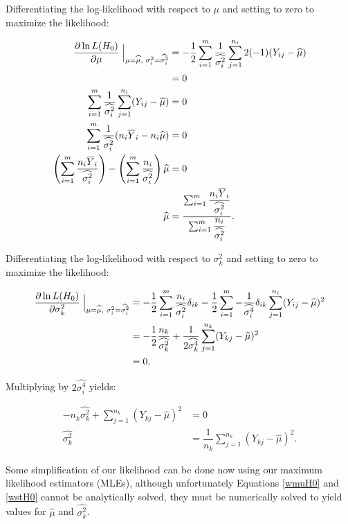 \documentclass[12pt,a4paper]{article}
\newcommand{\ovY}{\overline{Y}}
\newcommand{\wmu}{\widehat{\mu}}
\newcommand{\wst}[1]{\widehat{\sigma^2_{#1}}}
\newcommand{\wstq}[1]{\widehat{\sigma^4_{#1}}}
\begin{document}
	Differentiating the log-likelihood with respect to $\mu$ and setting to zero to maximize the likelihood:
	
	\begin{align}
		\dfrac{\partial \ln{L(H_0)}}{\partial \mu} \Bigm\lvert_{\mu = \wmu, \hspace{0.1cm}\sigma^2_i = \wst{i}} &= -\dfrac{1}{2} \sum_{i=1}^m \dfrac{1}{\wst{i}}\sum_{j=1}^{n_i} 2(-1)(Y_{ij}-\wmu) \nonumber\\
		&= 0 \nonumber\\
		\sum_{i=1}^m \dfrac{1}{\wst{i}}\sum_{j=1}^{n_i} (Y_{ij}-\wmu) &= 0 \nonumber\\
		\sum_{i=1}^m \dfrac{1}{\wst{i}} (n_i\ovY_i - n_i \wmu) &= 0 \nonumber\\
		\left(\sum_{i=1}^m \dfrac{n_i \ovY_i}{\wst{i}}\right) - \left(\sum_{i=1}^m \dfrac{n_i}{\wst{i}}\right)\wmu &= 0 \nonumber \\
		\wmu &= \dfrac{\sum_{i=1}^m \dfrac{n_i \ovY_i}{\wst{i}}}{\sum_{i=1}^m \dfrac{n_i}{\wst{i}}}. \label{wmuH0}
	\end{align}

	Differentiating the log-likelihood with respect to $\sigma^2_k$ and setting to zero to maximize the likelihood:
	
	\begin{align*}
		\dfrac{\partial \ln{L(H_0)}}{\partial \sigma^2_k} \Bigm\lvert_{\mu = \wmu, \hspace{0.1cm} \sigma^2_i = \wst{i}} &= -\dfrac{1}{2} \sum_{i=1}^m \dfrac{n_i}{\wst{i}}\delta_{ik} - \dfrac{1}{2} \sum_{i=1}^m -\dfrac{1}{\wstq{i}} \delta_{ik}\sum_{j=1}^{n_i} (Y_{ij}-\wmu)^2 \\
		&= -\dfrac{1}{2} \dfrac{n_k}{\wst{k}} + \dfrac{1}{2\wstq{k}} \sum_{j=1}^{n_k} (Y_{kj}-\wmu)^2 \\
		&= 0.
	\end{align*}

	Multiplying by $2\wstq{i}$ yields:
	
	\begin{align}
		-n_k\wst{k} + \sum_{j=1}^{n_k} (Y_{kj}-\wmu)^2 &= 0 \nonumber\\
		\wst{k} &= \dfrac{1}{n_k} \sum_{j=1}^{n_k} (Y_{kj}-\wmu)^2. \label{wstH0}
	\end{align}

	Some simplification of our likelihood can be done now using our maximum likelihood estimators (MLEs), although unfortunately Equations \ref{wmuH0} and \ref{wstH0} cannot be analytically solved, they must be numerically solved to yield values for $\wmu$ and $\wst{k}$.  
	
\end{document}
